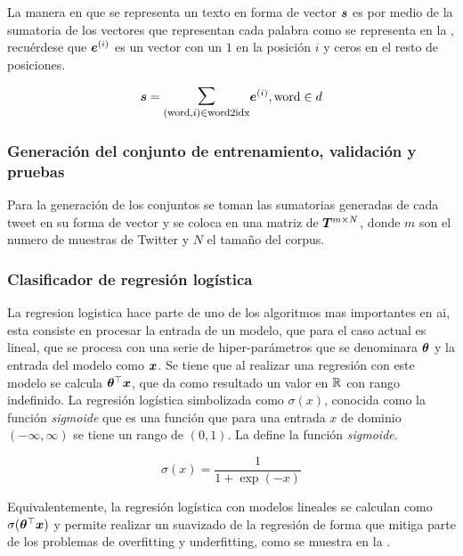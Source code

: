 La manera en que se representa un texto en forma de vector ${\bm{s}}$ es por medio de la sumatoria de los vectores que representan cada palabra como se representa en la , recuérdese que ${\bm{e}}^{(i)}$ es un vector con un $1$ en la posición $i$ y ceros en el resto de posiciones.

\begin{equation} \label{eq:bow-word-vector-sum}
  \vs = \mathlarger{\mathlarger{\sum}}_{(\text{word}, i) \in \text{word2idx}} \ve^{(i)}, \text{word} \in d
\end{equation}

\subsubsection{Generación del conjunto de entrenamiento, validación y pruebas}
Para la generación de los conjuntos se toman las sumatorias generadas de cada tweet en su forma de vector y se coloca en una matriz de ${\bm{T}}^{m \times N}$, donde $m$ son el numero de muestras de Twitter y $N$ el tamaño del \gls{corpus}.

\subsubsection{Clasificador de regresión logística}
La regresion logistica hace parte de uno de los algoritmos mas importantes en \gls{ai}, esta consiste en procesar la entrada de un modelo, que para el caso actual es lineal, que se procesa con una serie de hiper-parámetros que se denominara ${\bm{\theta}}$ y la entrada del modelo como ${\bm{x}}$. Se tiene que al realizar una regresión con este modelo se calcula ${\bm{\theta}}^{\top} {\bm{x}}$, que da como resultado un valor en $\mathbb{R}$ con rango indefinido. La regresión logística simbolizada como $\sigma(x)$, conocida como la función \emph{sigmoide} que es una función que para una entrada $x$ de dominio $(-\infty, \infty)$ se tiene un rango de $(0, 1)$. La  define la función \emph{sigmoide}.

\begin{equation} \label{eq:logits-formula}
  \sigma(x) = \frac{1} {1 + \exp(-x)}
\end{equation}

Equivalentemente, la regresión logística con modelos lineales se calculan como $\sigma({\bm{\theta}}^{\top} {\bm{x}})$ y permite realizar un suavizado de la regresión de forma que mitiga parte de los problemas de \gls{overfitting} y \gls{underfitting}, como se muestra en la .

